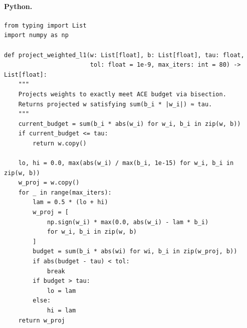 \documentclass[11pt]{article}
\theoremstyle{definition}
\theoremstyle{remark}
\newcommand{\1}{\mathbf{1}}
\begin{document}
\paragraph{Python.}
\begin{lstlisting}[style=py,caption={Exact weighted-$\ell_1$ projection (ACE budget)}]
from typing import List
import numpy as np

def project_weighted_l1(w: List[float], b: List[float], tau: float, 
                        tol: float = 1e-9, max_iters: int = 80) -> List[float]:
    """
    Projects weights to exactly meet ACE budget via bisection.
    Returns projected w satisfying sum(b_i * |w_i|) ≈ tau.
    """
    current_budget = sum(b_i * abs(w_i) for w_i, b_i in zip(w, b))
    if current_budget <= tau:
        return w.copy()

    lo, hi = 0.0, max(abs(w_i) / max(b_i, 1e-15) for w_i, b_i in zip(w, b))
    w_proj = w.copy()
    for _ in range(max_iters):
        lam = 0.5 * (lo + hi)
        w_proj = [
            np.sign(w_i) * max(0.0, abs(w_i) - lam * b_i)
            for w_i, b_i in zip(w, b)
        ]
        budget = sum(b_i * abs(wi) for wi, b_i in zip(w_proj, b))
        if abs(budget - tau) < tol:
            break
        if budget > tau:
            lo = lam
        else:
            hi = lam
    return w_proj
\end{lstlisting}
\end{document}

